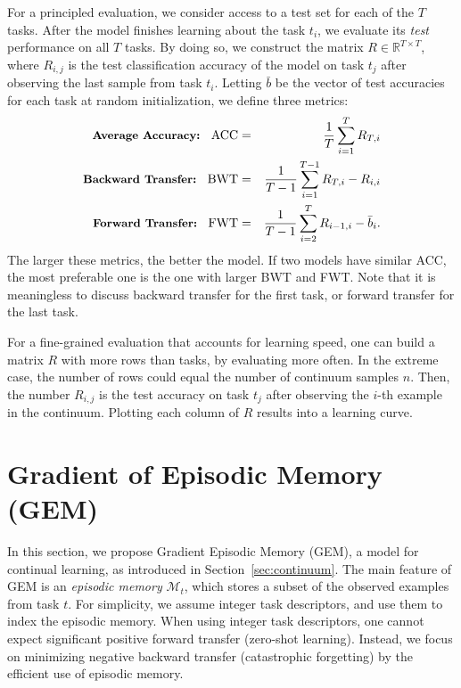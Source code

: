 \documentclass{article}
\begin{document}
For a principled evaluation, we consider access to a test set for each of the
$T$ tasks. After the model finishes learning about the task $t_i$, we evaluate
its \emph{test} performance on all $T$ tasks.  By doing so, we construct the
matrix $R \in \mathbb{R}^{T \times T}$, where $R_{i,j}$ is the test
classification accuracy of the model on task $t_j$ after observing the last
sample from task $t_i$.  Letting $\bar{b}$ be the vector of test accuracies for
each task at random initialization, we define three metrics:
\begin{eqnarray}
\mbox{\small {\bf Average Accuracy: } \normalsize ACC} & = & \frac{1}{T}
\sum_{i=1}^T R_{T,i} \label{eq:acc} \\
\mbox{\small {\bf Backward Transfer: } \normalsize BWT} & = & \frac{1}{T-1}
\sum_{i=1}^{T-1} R_{T,i} - R_{i,i}   \label{eq:bwt} \\
\mbox{\small {\bf Forward Transfer: } \normalsize FWT} & = & \frac{1}{T-1}
\sum_{i=2}^{T} R_{i-1,i} - \bar{b}_i. \label{eq:fwt} 
\end{eqnarray}
The larger these metrics, the better the model. If two
models have similar ACC, the most preferable one is the one with larger BWT and
FWT. Note that it is meaningless to discuss backward transfer for the first
task, or forward transfer for the last task.

For a fine-grained evaluation that accounts for learning speed, one 
can build a matrix $R$ with more rows than tasks, by evaluating more often.
In the extreme case, the number of rows could equal the number of
continuum samples $n$.  Then, the number $R_{i,j}$ is the test accuracy
on task $t_j$ after observing the $i$-th example in the continuum. Plotting
each column of $R$ results into a learning curve.

\section{Gradient of Episodic Memory (GEM)}\label{sec:model}
In this section, we propose Gradient Episodic Memory (GEM), a model for
continual learning, as introduced in Section~\ref{sec:continuum}.  The main
feature of GEM is an \emph{episodic memory} $\mathcal{M}_t$, which stores a
subset of the observed examples from task $t$.  For simplicity, we assume
integer task descriptors, and use them to index the episodic memory.  When
using integer task descriptors, one cannot expect significant positive forward
transfer (zero-shot learning). Instead, we focus on minimizing negative
backward transfer (catastrophic forgetting) by the efficient use of episodic
memory.
\end{document}
